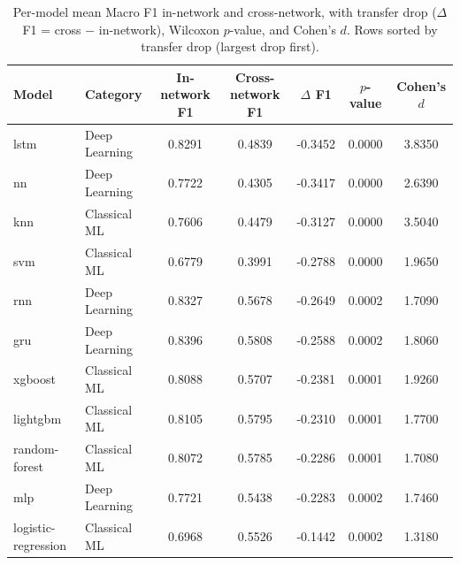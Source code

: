 \begin{table}
\caption{Per-model mean Macro F1 in-network and cross-network, with transfer drop ($\Delta$F1 = cross $-$ in-network), Wilcoxon $p$-value, and Cohen's $d$. Rows sorted by transfer drop (largest drop first).}
\label{tab:q3_per_model_drop}
\begin{tabular}{llccccc}
\toprule
Model & Category & In-network F1 & Cross-network F1 & $\Delta$ F1 & $p$-value & Cohen's $d$ \\
\midrule
lstm & Deep Learning & 0.8291 & 0.4839 & -0.3452 & 0.0000 & 3.8350 \\
nn & Deep Learning & 0.7722 & 0.4305 & -0.3417 & 0.0000 & 2.6390 \\
knn & Classical ML & 0.7606 & 0.4479 & -0.3127 & 0.0000 & 3.5040 \\
svm & Classical ML & 0.6779 & 0.3991 & -0.2788 & 0.0000 & 1.9650 \\
rnn & Deep Learning & 0.8327 & 0.5678 & -0.2649 & 0.0002 & 1.7090 \\
gru & Deep Learning & 0.8396 & 0.5808 & -0.2588 & 0.0002 & 1.8060 \\
xgboost & Classical ML & 0.8088 & 0.5707 & -0.2381 & 0.0001 & 1.9260 \\
lightgbm & Classical ML & 0.8105 & 0.5795 & -0.2310 & 0.0001 & 1.7700 \\
random-forest & Classical ML & 0.8072 & 0.5785 & -0.2286 & 0.0001 & 1.7080 \\
mlp & Deep Learning & 0.7721 & 0.5438 & -0.2283 & 0.0002 & 1.7460 \\
logistic-regression & Classical ML & 0.6968 & 0.5526 & -0.1442 & 0.0002 & 1.3180 \\
\bottomrule
\end{tabular}
\end{table}
